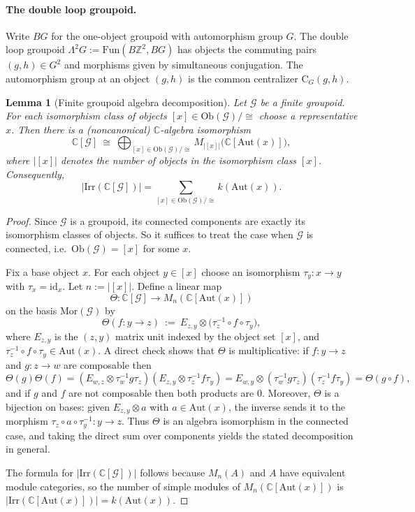 \documentclass[11pt]{article}
\newtheorem{lemma}[theorem]{Lemma}
\theoremstyle{definition}
\theoremstyle{remark}
\theoremstyle{definition}
\theoremstyle{plain}
\newcommand{\Irr}{\mathrm{Irr}}
\newcommand{\C}{\mathrm{C}}
\newcommand{\Aut}{\mathrm{Aut}}
\begin{document}
\paragraph{The double loop groupoid.}
Write $BG$ for the one-object groupoid with automorphism group $G$.
The double loop groupoid $\Lambda^2G:=\mathrm{Fun}(B\mathbb Z^2,BG)$ has objects the commuting pairs $(g,h)\in G^2$ and morphisms given by simultaneous conjugation.
The automorphism group at an object $(g,h)$ is the common centralizer $\C_G(g,h)$.

\begin{lemma}[Finite groupoid algebra decomposition]\label{lem:groupoid-decomp}
Let $\mathcal G$ be a finite groupoid. For each isomorphism class of objects $[x]\in \mathrm{Ob}(\mathcal G)/\cong$
choose a representative $x$.
Then there is a (noncanonical) $\mathbb C$-algebra isomorphism
\[
\mathbb C[\mathcal G]\ \cong\ \bigoplus_{[x]\in \mathrm{Ob}(\mathcal G)/\cong} M_{|[x]|}\big(\mathbb C[\Aut(x)]\big),
\]
where $|[x]|$ denotes the number of objects in the isomorphism class $[x]$.
Consequently,
\[
|\Irr(\mathbb C[\mathcal G])|
=\sum_{[x]\in \mathrm{Ob}(\mathcal G)/\cong} k(\Aut(x)).
\]
\end{lemma}

\begin{proof}
Since $\mathcal G$ is a groupoid, its connected components are exactly its isomorphism classes of objects.
So it suffices to treat the case when $\mathcal G$ is connected, i.e.\ $\mathrm{Ob}(\mathcal G)=[x]$ for some $x$.

Fix a base object $x$.
For each object $y\in [x]$ choose an isomorphism $\tau_y:x\to y$ with $\tau_x=\mathrm{id}_x$.
Let $n:=|[x]|$.
Define a linear map
\[
\Theta:\mathbb C[\mathcal G]\to M_n(\mathbb C[\Aut(x)])
\]
on the basis $\mathrm{Mor}(\mathcal G)$ by
\[
\Theta(f:y\to z)\ :=\ E_{z,y}\otimes\big(\tau_z^{-1}\circ f\circ \tau_y\big),
\]
where $E_{z,y}$ is the $(z,y)$ matrix unit indexed by the object set $[x]$, and
$\tau_z^{-1}\circ f\circ \tau_y\in\Aut(x)$.
A direct check shows that $\Theta$ is multiplicative:
if $f:y\to z$ and $g:z\to w$ are composable then
\[
\Theta(g)\Theta(f)
=(E_{w,z}\otimes \tau_w^{-1}g\tau_z)(E_{z,y}\otimes \tau_z^{-1}f\tau_y)
=E_{w,y}\otimes (\tau_w^{-1}g\tau_z)(\tau_z^{-1}f\tau_y)
=\Theta(g\circ f),
\]
and if $g$ and $f$ are not composable then both products are $0$.
Moreover, $\Theta$ is a bijection on bases: given $E_{z,y}\otimes a$ with $a\in\Aut(x)$, the inverse sends it to
the morphism $\tau_z\circ a\circ \tau_y^{-1}:y\to z$.
Thus $\Theta$ is an algebra isomorphism in the connected case, and taking the direct sum over components
yields the stated decomposition in general.

The formula for $|\Irr(\mathbb C[\mathcal G])|$ follows because $M_n(A)$ and $A$ have equivalent module categories,
so the number of simple modules of $M_n(\mathbb C[\Aut(x)])$ is $|\Irr(\mathbb C[\Aut(x)])|=k(\Aut(x))$.
\end{proof}
\end{document}
